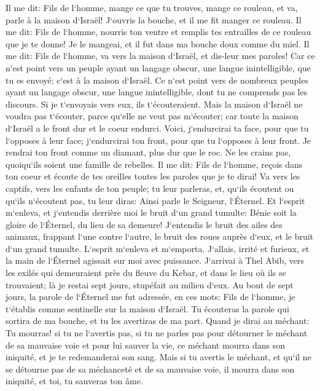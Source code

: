 \verse Il me dit: Fils de l`homme, mange ce que tu trouves, mange ce rouleau, et va, parle à la maison d`Israël! 
\verse J`ouvris la bouche, et il me fit manger ce rouleau. 
\verse Il me dit: Fils de l`homme, nourris ton ventre et remplis tes entrailles de ce rouleau que je te donne! Je le mangeai, et il fut dans ma bouche doux comme du miel. 
\verse Il me dit: Fils de l`homme, va vers la maison d`Israël, et dis-leur mes paroles! 
\verse Car ce n`est point vers un peuple ayant un langage obscur, une langue inintelligible, que tu es envoyé; c`est à la maison d`Israël. 
\verse Ce n`est point vers de nombreux peuples ayant un langage obscur, une langue inintelligible, dont tu ne comprends pas les discours. Si je t`envoyais vers eux, ils t`écouteraient. 
\verse Mais la maison d`Israël ne voudra pas t`écouter, parce qu`elle ne veut pas m`écouter; car toute la maison d`Israël a le front dur et le coeur endurci. 
\verse Voici, j`endurcirai ta face, pour que tu l`opposes à leur face; j`endurcirai ton front, pour que tu l`opposes à leur front. 
\verse Je rendrai ton front comme un diamant, plus dur que le roc. Ne les crains pas, quoiqu`ils soient une famille de rebelles. 
\verse Il me dit: Fils de l`homme, reçois dans ton coeur et écoute de tes oreilles toutes les paroles que je te dirai! 
\verse Va vers les captifs, vers les enfants de ton peuple; tu leur parleras, et, qu`ils écoutent ou qu`ils n`écoutent pas, tu leur diras: Ainsi parle le Seigneur, l`Éternel. 
\verse Et l`esprit m`enleva, et j`entendis derrière moi le bruit d`un grand tumulte: Bénie soit la gloire de l`Éternel, du lieu de sa demeure! 
\verse J`entendis le bruit des ailes des animaux, frappant l`une contre l`autre, le bruit des roues auprès d`eux, et le bruit d`un grand tumulte. 
\verse L`esprit m`enleva et m`emporta. J`allais, irrité et furieux, et la main de l`Éternel agissait sur moi avec puissance. 
\verse J`arrivai à Thel Abib, vers les exilés qui demeuraient près du fleuve du Kebar, et dans le lieu où ils se trouvaient; là je restai sept jours, stupéfait au milieu d`eux. 
\verse Au bout de sept jours, la parole de l`Éternel me fut adressée, en ces mots: 
\verse Fils de l`homme, je t`établis comme sentinelle sur la maison d`Israël. Tu écouteras la parole qui sortira de ma bouche, et tu les avertiras de ma part. 
\verse Quand je dirai au méchant: Tu mourras! si tu ne l`avertis pas, si tu ne parles pas pour détourner le méchant de sa mauvaise voie et pour lui sauver la vie, ce méchant mourra dans son iniquité, et je te redemanderai son sang. 
\verse Mais si tu avertis le méchant, et qu`il ne se détourne pas de sa méchanceté et de sa mauvaise voie, il mourra dans son iniquité, et toi, tu sauveras ton âme. 
